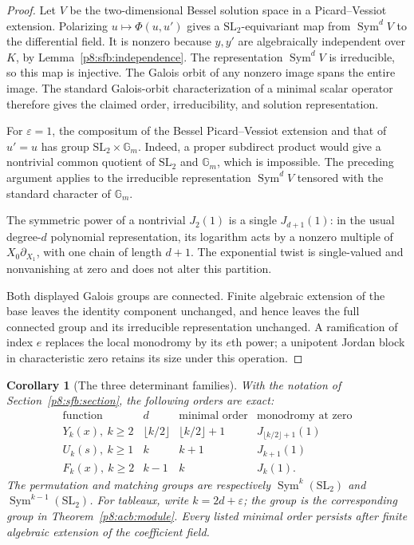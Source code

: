 \documentclass[11pt,a4paper]{article}
\newtheorem{corollary}[theorem]{Corollary}
\theoremstyle{definition}
\theoremstyle{remark}
\numberwithin{equation}{section}
\begin{document}
\begin{proof}
Let $V$ be the two-dimensional Bessel solution space in a
Picard--Vessiot extension.  Polarizing $u\mapsto\Phi(u,u')$ gives
a $\mathrm{SL}_2$-equivariant map from $\operatorname{Sym}^dV$
to the differential field.  It is nonzero because $y,y'$ are
algebraically independent over $K$, by Lemma~\ref{p8:sfb:independence}.
The representation $\operatorname{Sym}^dV$ is irreducible,
so this map is injective.  The Galois orbit of any nonzero image
spans the entire image.  The standard Galois-orbit characterization
of a minimal scalar operator therefore gives the claimed order,
irreducibility, and solution representation.

For $\varepsilon=1$, the compositum of the Bessel
Picard--Vessiot extension and that of $u'=u$ has group
$\mathrm{SL}_2\times\mathbb G_m$.  Indeed, a proper subdirect
product would give a nontrivial common quotient of
$\mathrm{SL}_2$ and $\mathbb G_m$, which is impossible.
The preceding argument applies to the irreducible representation
$\operatorname{Sym}^dV$ tensored with the standard character of
$\mathbb G_m$.

The symmetric power of a nontrivial $J_2(1)$ is a single
$J_{d+1}(1)$: in the usual degree-$d$ polynomial representation,
its logarithm acts by a nonzero multiple of $X_0\partial_{X_1}$,
with one chain of length $d+1$.  The exponential twist is
single-valued and nonvanishing at zero and does not alter this
partition.

Both displayed Galois groups are connected.  Finite algebraic
extension of the base leaves the identity component unchanged,
and hence leaves the full connected group and its irreducible
representation unchanged.  A ramification of index $e$ replaces
the local monodromy by its $e$th power; a unipotent Jordan block
in characteristic zero retains its size under this operation.
\end{proof}

\begin{corollary}[The three determinant families]\label{p8:acb:families}
With the notation of Section~\ref{p8:sfb:section}, the following orders are exact:
\[
\begin{array}{c|c|c|c}
 \text{function}&d&\text{minimal order}&\text{monodromy at zero}\\ \hline
 Y_k(x),\ k\ge2&\lfloor k/2\rfloor&\lfloor k/2\rfloor+1
                                  &J_{\lfloor k/2\rfloor+1}(1)\\
 U_k(s),\ k\ge1&k&k+1&J_{k+1}(1)\\
 F_k(x),\ k\ge2&k-1&k&J_k(1).
\end{array}
\]
The permutation and matching groups are respectively
$\operatorname{Sym}^{k}(\mathrm{SL}_2)$ and
$\operatorname{Sym}^{k-1}(\mathrm{SL}_2)$.
For tableaux, write $k=2d+\varepsilon$; the group is the
corresponding group in Theorem~\ref{p8:acb:module}.
Every listed minimal order persists after finite algebraic
extension of the coefficient field.
\end{corollary}
\end{document}
